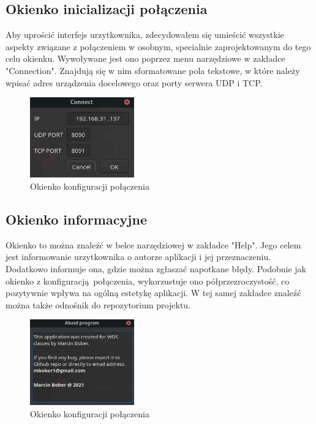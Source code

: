 \documentclass[12pt,a4paper,polish]{article}
\begin{document}
  \subsection{Okienko inicializacji połączenia}
  Aby uprościć interfejs urzytkownika, zdecydowałem się umieścić wszystkie aspekty
  związane z połączeniem w osobnym, specialnie zaprojektowanym do tego celu okienku.
  Wywoływane jest ono poprzez menu narzędziowe w zakładce "Connection".
  Znajdują się w nim sformatowane pola tekstowe, w które należy wpisać adres urządzenia
  docelowego oraz porty serwera UDP i TCP.  

  \begin{figure}[h]
    \centering
    \includegraphics[width=0.4\textwidth]{img/final/conn.png}
    \caption{Okienko konfiguracji połączenia}
    \label{fig:conn}
  \end{figure}



  \subsection{Okienko informacyjne}
  Okienko to można znaleźć w belce narzędziowej w zakładce "Help". 
  Jego celem jest informowanie urzytkownika o autorze aplikacji i
  jej przeznaczeniu. Dodatkowo informuje ona, gdzie można zgłaszać
  napotkane błędy. Podobnie jak okienko z konfiguracją połączenia, 
  wykorzustuje ono półprzezroczystość, co pozytywnie wpływa na ogólną
  estetykę aplikacji. W tej samej zakładce znaleźć można także odnośnik
  do repozytorium projektu.

  \begin{figure}[h]
    \centering
    \includegraphics[width=0.4\textwidth]{img/final/info.png}
    \caption{Okienko konfiguracji połączenia}
    \label{fig:info}
  \end{figure}
\end{document}
